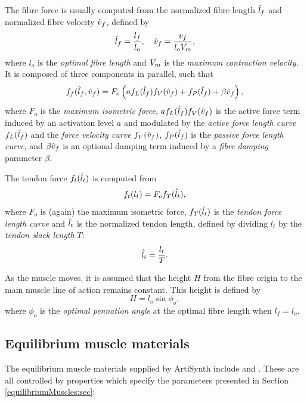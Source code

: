 The fibre force is usually computed from the normalized fibre length
$\hat{l}_f$ and normalized fibre velocity $\hat{v}_f$, defined by
%
\begin{equation}
\hat{l}_f = \frac{l_f}{l_o}, \quad \hat{v}_f = \frac{v_f}{l_o V_{m}},
\label{lfn:eqn}
\end{equation}
%
where $l_o$ is the {\it optimal fibre length} and $V_{m}$ is the {\it maximum
contraction velocity}. It is composed of three components in parallel,
such that
%
\begin{equation}
f_f (\hat{l}_f, \hat{v}_f) = F_o \left( a f_L(\hat{l}_f) f_V(\hat{v}_f) + f_P(\hat{l}_f) +
\beta \hat{v}_f \right),
\label{ff:eqn}
\end{equation}
%
where $F_o$ is the {\it maximum isometric force},
$a f_L(\hat{l}_f) f_V(\hat{v}_f)$ is the active force term induced by an
activation level $a$ and modulated by the {\it active force length
curve} $f_L(\hat{l}_f)$ and the {\it force velocity curve} $f_V(\hat{v}_f)$,
$f_P(\hat{l}_f)$ is the {\it passive force length curve}, and $\beta \hat{v}_f$
is an optional damping term induced by a {\it fibre damping} parameter
$\beta$.

The tendon force $f_t(\hat{l}_t)$ is computed from 
%
\begin{equation*}
f_t(l_t) = F_o f_T (\hat{l}_t),
\end{equation*}
%
where $F_o$ is (again) the maximum isometric force, $f_T(\hat{l}_t)$ is the
{\it tendon force length curve} and $\hat{l}_t$ is the normalized tendon
length, defined by dividing $l_t$ by the {\it tendon slack length}
$T$:
%
\begin{equation*}
\hat{l}_t = \frac{l_t}{T}.
\end{equation*}
%

As the muscle moves, it is assumed that the height $H$ from the fibre
origin to the main muscle line of action remains constant.
This height is defined by
%
\begin{equation*}
H = l_o \sin \phi_o,
\end{equation*}
%
where $\phi_o$ is the {\it optimal pennation angle} at the optimal
fibre length when $l_f = l_o$.

\subsection{Equilibrium muscle materials}
\label{EquilibriumMuscleMaterials:sec}

The equilibrium muscle materials supplied by ArtiSynth include
 and
.  These
are all controlled by properties which specify the parameters
presented in Section \ref{equilibriumMuscles:sec}:

